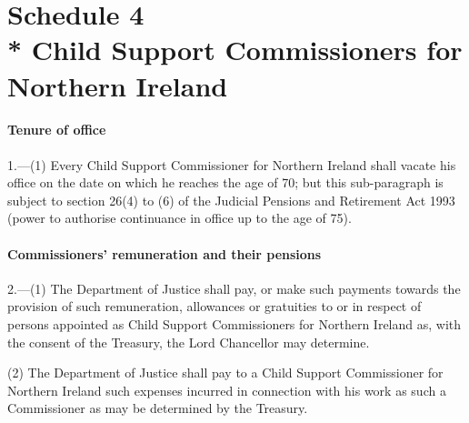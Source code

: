 \documentclass[a4paper]{article}
\begin{document}
\part[Schedule 4 --- Child Support Commissioners for Northern Ireland]{Schedule 4\\* Child Support Commissioners for Northern Ireland}

\renewcommand\parthead{--- Schedule 4}


\subsection*{Tenure of office}

1.—(1) Every Child Support Commissioner for Northern Ireland shall vacate his office on the date on which he reaches the age of 70; but this sub-paragraph is subject to section 26(4) to (6) of the Judicial Pensions and Retirement Act 1993 (power to authorise continuance in office up to the age of 75).


\subsection*{Commissioners' remuneration and their pensions}

2.—(1) The Department of Justice shall pay, or make such payments towards the provision of such remuneration, allowances or gratuities to or in respect of persons appointed as Child Support Commissioners for Northern Ireland as, with the consent of the Treasury, the Lord Chancellor may determine.

(2) The Department of Justice shall pay to a Child Support Commissioner for Northern Ireland such expenses incurred in connection with his work as such a Commissioner as may be determined by the Treasury.
\end{document}

